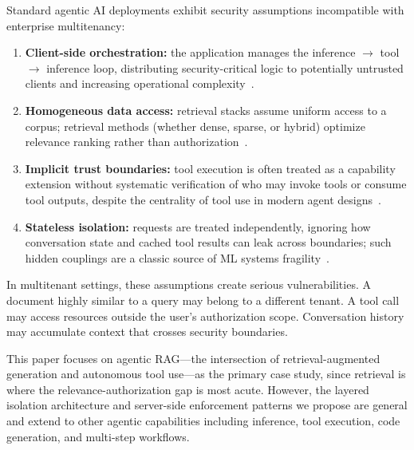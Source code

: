 \documentclass[sigconf]{acmart}
\begin{document}
Standard agentic AI deployments exhibit security assumptions incompatible with enterprise multitenancy:
\begin{enumerate}
  \item \textbf{Client-side orchestration:} the application manages the inference $\rightarrow$ tool $\rightarrow$ inference loop, distributing security-critical logic to potentially untrusted clients and increasing operational complexity~\cite{amershi2019se4ml}.
  \item \textbf{Homogeneous data access:} retrieval stacks assume uniform access to a corpus; retrieval methods (whether dense, sparse, or hybrid) optimize relevance ranking rather than authorization~\cite{karpukhin2020dpr}.
  \item \textbf{Implicit trust boundaries:} tool execution is often treated as a capability extension without systematic verification of who may invoke tools or consume tool outputs, despite the centrality of tool use in modern agent designs~\cite{yao2023react,schick2023toolformer,karpas2022mrkl}.
  \item \textbf{Stateless isolation:} requests are treated independently, ignoring how conversation state and cached tool results can leak across boundaries; such hidden couplings are a classic source of ML systems fragility~\cite{sculley2015hiddentechnicaldebt}.
\end{enumerate}

In multitenant settings, these assumptions create serious vulnerabilities.
A document highly similar to a query may belong to a different tenant.
A tool call may access resources outside the user's authorization scope.
Conversation history may accumulate context that crosses security boundaries.

This paper focuses on agentic RAG---the intersection of retrieval-augmented generation and autonomous tool use---as the primary case study, since retrieval is where the relevance-authorization gap is most acute. However, the layered isolation architecture and server-side enforcement patterns we propose are general and extend to other agentic capabilities including inference, tool execution, code generation, and multi-step workflows.
\end{document}
